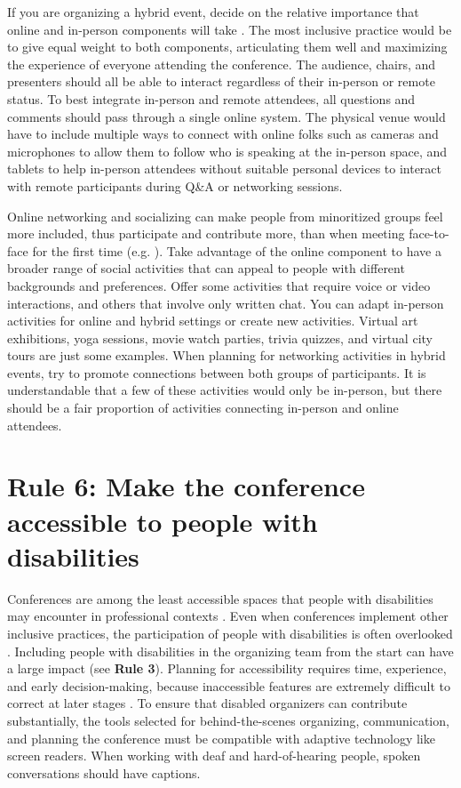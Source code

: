 \documentclass[10pt,letterpaper]{article}
\begin{document}
If you are organizing a hybrid event, decide on the relative importance that online and in-person components will take \cite{bajpai_towards_2021}. The most inclusive practice would be to give equal weight to both components, articulating them well and maximizing the experience of everyone attending the conference.
The audience, chairs, and presenters should all be able to interact regardless of their in-person or remote status. 
To best integrate in-person and remote attendees, all questions and comments should pass through a single online system. 
The physical venue would have to include multiple ways to connect with online folks such as cameras and microphones to allow them to follow who is speaking at the in-person space, and tablets to help in-person attendees without suitable personal devices to interact with remote participants during Q\&A or networking sessions.

Online networking and socializing can make people from minoritized groups feel more included, thus participate and contribute more, than when meeting face-to-face for the first time (e.g. \cite{trianaDoesOrderFacetoFace2012,blackEngenderingBelongingThoughtful2020}).
Take advantage of the online component to have a broader range of social activities that can appeal to people with different backgrounds and preferences.
Offer some activities that require voice or video interactions, and others that involve only written chat.
You can adapt in-person activities for online and hybrid settings or create new activities. 
Virtual art exhibitions, yoga sessions, movie watch parties, trivia quizzes, and virtual city tours are just some examples.
When planning for networking activities in hybrid events, try to
promote connections between both groups of participants.
It is understandable that a few of these activities would only be in-person, but 
there should be a fair proportion of activities connecting in-person and online attendees. 


\section*{Rule 6: Make the conference accessible to people with disabilities}
\label{rule_accessibility}

Conferences are among the least accessible spaces that people with disabilities may encounter in professional contexts \cite{priceAccessImaginedConstruction2009}. Even when conferences implement other inclusive practices, the participation of people with disabilities is often overlooked \cite{marks2021meeting}. Including people with disabilities in the organizing team from the start can have a large impact (see \textbf{Rule 3}). Planning for accessibility requires time, experience, and early decision-making, because inaccessible features are extremely difficult to correct at later stages \cite{irishIncreasingParticipationUsing2020}. To ensure that disabled organizers can contribute substantially, the tools selected for behind-the-scenes organizing, communication, and planning the conference must be compatible with adaptive technology like screen readers. When working with deaf and hard-of-hearing people, spoken conversations should have captions.
\end{document}
